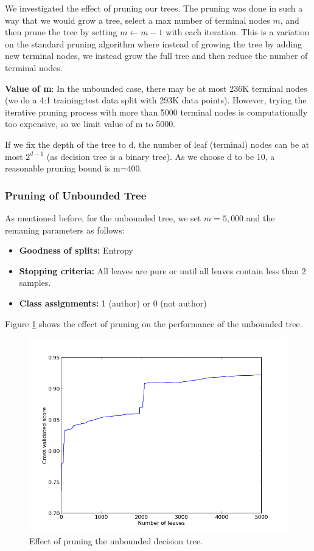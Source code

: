 \documentclass[letterpaper,12pt]{article}
\begin{document}
We investigated the effect of pruning our trees. The pruning was done in such a way that we would grow a tree, select a max number of terminal nodes $m$, and then prune the tree by setting $m \leftarrow m -1$ with each iteration. This is a variation on the standard pruning algorithm where instead of growing the tree by adding new terminal nodes, we instead grow the full tree and then reduce the number of terminal nodes.

\textbf{Value of m}: In the unbounded case, there may be at most 236K terminal nodes (we do a 4:1 training:test data split with 293K data points). However, trying the iterative pruning process with more than 5000 terminal nodes is computationally too expensive, so we limit value of m to 5000.    

If we fix the depth of the tree to d, the number of leaf (terminal) nodes can be at most $2^{d-1}$ (as decision tree is a binary tree). As we choose d to be 10, a reasonable pruning bound is m=400. 

\subsubsection{Pruning of Unbounded Tree}

As mentioned before, for the unbounded tree, we set $m=5,000$ and the remaning parameters as follows:

\begin{itemize}
\item\textbf{Goodness of splits:} Entropy
\item\textbf{Stopping criteria:} All leaves are pure or until all leaves contain less than 2 samples.
\item\textbf{Class assignments:} 1 (author) or 0 (not author)
\end{itemize}

Figure \ref{fig:prune_unlimited} shows the effect of pruning on the performance of the unbounded tree. 

\begin{figure}[ht!]
\includegraphics[width=\textwidth]{prune-unlimited.png}
\caption{Effect of pruning the unbounded decision tree.}\label{fig:prune_unlimited}
\end{figure}
\end{document}

